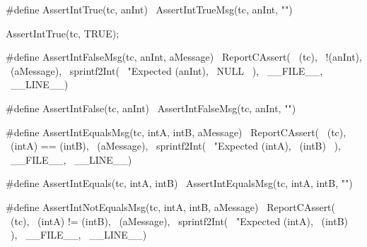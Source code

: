 {#define AssertIntTrue(tc, anInt) \
  AssertIntTrueMsg(tc, anInt, "")
\stopCHeader

\startCTest
  AssertIntTrue(tc, TRUE);
\stopCTest
\stopTestCase
\stopTestSuite

\startTestSuite[assertIntFalse]

\startCHeader
#define AssertIntFalseMsg(tc, anInt, aMessage) \
  ReportCAssert(                               \
    (tc),                                      \
    !(anInt),                                  \
    (aMessage),                                \
    sprintf2Int(                               \
      "Expected %
      (anInt),                                 \
      NULL                                     \
    ),                                         \
    __FILE__,                                  \
    __LINE__)

#define AssertIntFalse(tc, anInt) \
  AssertIntFalseMsg(tc, anInt, "")
\stopCHeader

\stopTestSuite

\startTestSuite[assertIntEquals]

\startCHeader
#define AssertIntEqualsMsg(tc, intA, intB, aMessage) \
  ReportCAssert(                                     \
    (tc),                                            \
    (intA) == (intB),                                \
    (aMessage),                                      \
    sprintf2Int(                                     \
      "Expected %
      (intA),                                        \
      (intB)                                         \
    ),                                               \
    __FILE__,                                        \
    __LINE__)

#define AssertIntEquals(tc, intA, intB) \
  AssertIntEqualsMsg(tc, intA, intB, "")
\stopCHeader

\stopTestSuite

\startTestSuite[assertIntNotEquals]

\startCHeader
#define AssertIntNotEqualsMsg(tc, intA, intB, aMessage) \
  ReportCAssert(                                        \
    (tc),                                               \
    (intA) != (intB),                                   \
    (aMessage),                                         \
    sprintf2Int(                                        \
      "Expected %
      (intA),                                           \
      (intB)                                            \
    ),                                                  \
    __FILE__,                                           \
    __LINE__)

}
